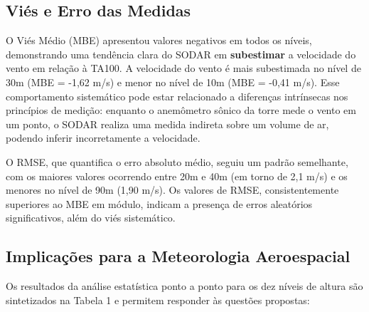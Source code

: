 \documentclass[12pt, a4paper, twocolumn]{article}
\begin{document}
\subsection{Viés e Erro das Medidas}

O Viés Médio (MBE) apresentou valores negativos em todos os níveis, demonstrando uma tendência clara do SODAR em \textbf{subestimar} a velocidade do vento em relação à TA100. A velocidade do vento é mais subestimada no nível de 30m (MBE = -1,62 m/s) e menor no nível de 10m (MBE = -0,41 m/s). Esse comportamento sistemático pode estar relacionado a diferenças intrínsecas nos princípios de medição: enquanto o anemômetro sônico da torre mede o vento em um ponto, o SODAR realiza uma medida indireta sobre um volume de ar, podendo inferir incorretamente a velocidade.

O RMSE, que quantifica o erro absoluto médio, seguiu um padrão semelhante, com os maiores valores ocorrendo entre 20m e 40m (em torno de 2,1 m/s) e os menores no nível de 90m (1,90 m/s). Os valores de RMSE, consistentemente superiores ao MBE em módulo, indicam a presença de erros aleatórios significativos, além do viés sistemático.

\subsection{Implicações para a Meteorologia Aeroespacial}

Os resultados da análise estatística ponto a ponto para os dez níveis de altura são sintetizados na Tabela 1 e permitem responder às questões propostas:
\end{document}
